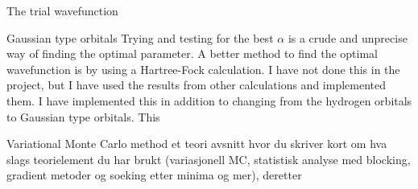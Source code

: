 \documentclass[a4paper, 12pt, titlepage]{article}
\begin{document}
\begin{section}{The trial wavefunction}
 \begin{subsection}{Gaussian type orbitals}
  Trying and testing for the best $\alpha$ is a crude and unprecise way of finding the optimal parameter. A better method to find the optimal wavefunction is by using a Hartree-Fock calculation. I have not done this in the project, but I have used the results from other calculations and implemented them. I have implemented this in addition to changing from the hydrogen orbitals to Gaussian type orbitals. This 

 \end{subsection}
\end{section}

\begin{section}{Variational Monte Carlo method}
   et teori avsnitt hvor du skriver kort om hva slags teorielement du har brukt (variasjonell MC, statistisk analyse med blocking, gradient metoder og soeking etter minima og mer), deretter


\end{section}
\end{document}
